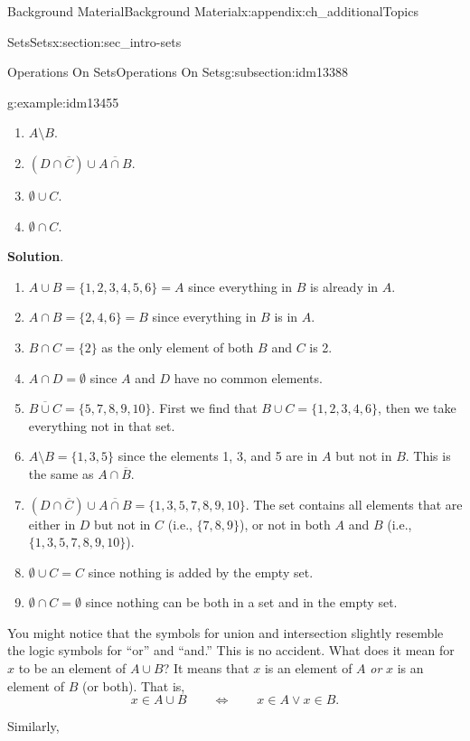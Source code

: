 \documentclass[oneside,10pt,]{book}
\numberwithin{equation}{chapter}
\def\Iff{\Leftrightarrow}
\begin{document}
\begin{appendixptx}{Background Material}{}{Background Material}{}{}{x:appendix:ch_additionalTopics}
\begin{sectionptx}{Sets}{}{Sets}{}{}{x:section:sec_intro-sets}
\begin{subsectionptx}{Operations On Sets}{}{Operations On Sets}{}{}{g:subsection:idm13388}
\begin{example}{}{g:example:idm13455}
\begin{enumerate}
\item{}\(A \setminus B\).%
\item{}\((D \cap \overline C) \cup \overline{A \cap B}\).%
\item{}\(\emptyset \cup C\).%
\item{}\(\emptyset \cap C\).%
\end{enumerate}
%
\par\smallskip%
\noindent\textbf{Solution}.\hypertarget{g:solution:idm13482}{}\quad{}%
\begin{enumerate}
\item{}\(A \cup B = \{1, 2, 3, 4, 5, 6\} = A\) since everything in \(B\) is already in \(A\).%
\item{}\(A \cap B = \{2, 4, 6\} = B\) since everything in \(B\) is in \(A\).%
\item{}\(B \cap C = \{2\}\) as the only element of both \(B\) and \(C\) is 2.%
\item{}\(A \cap D = \emptyset\) since \(A\) and \(D\) have no common elements.%
\item{}\(\overline{B \cup C} = \{5, 7, 8, 9, 10\}\). First we find that \(B \cup C = \{1, 2, 3, 4, 6\}\), then we take everything not in that set.%
\item{}\(A \setminus B = \{1, 3, 5\}\) since the elements 1, 3, and 5 are in \(A\) but not in \(B\). This is the same as \(A \cap \overline B\).%
\item{}\((D \cap \overline C) \cup \overline{A \cap B} = \{1, 3, 5, 7, 8, 9, 10\}.\) The set contains all elements that are either in \(D\) but not in \(C\) (i.e., \(\{7,8,9\}\)), or not in both \(A\) and \(B\) (i.e., \(\{1,3,5,7,8,9,10\}\)).%
\item{}\(\emptyset \cup C = C\) since nothing is added by the empty set.%
\item{}\(\emptyset \cap C = \emptyset\) since nothing can be both in a set and in the empty set.%
\end{enumerate}
%
\end{example}
You might notice that the symbols for union and intersection slightly resemble the logic symbols for ``or'' and ``and.'' This is no accident. What does it mean for \(x\) to be an element of \(A\cup B\)? It means that \(x\) is an element of \(A\) \emph{or} \(x\) is an element of \(B\) (or both). That is,%
\begin{equation*}
x \in A \cup B \qquad \Iff \qquad x \in A \vee x \in B.
\end{equation*}
%
\par
Similarly,%
\begin{equation*}

\end{equation*}
\end{subsectionptx}
\end{sectionptx}
\end{appendixptx}
\end{document}
